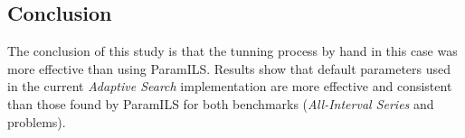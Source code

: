 \subsection{Conclusion}

The conclusion of this study is that the tunning process by hand in this case was more effective than using {\sc ParamILS}. Results show that default parameters used in the current {\it Adaptive Search} implementation are more effective and consistent than those found by {\sc ParamILS} for both benchmarks ({\it All-Interval Series} and \carr{} problems).